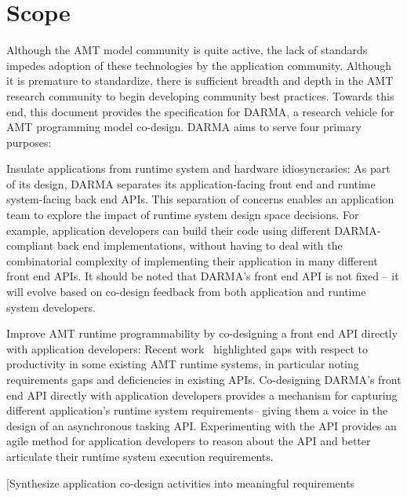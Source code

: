 \section{Scope}\label{sec:scope}
Although the \gls{AMT} model community is quite active, the lack of
standards impedes adoption of these technologies by the application community.
Although it is premature to standardize, there is sufficient  
breadth and depth in the \gls{AMT} research community to begin developing community best
practices.  Towards this end, this document provides the specification for \gls{DARMA},
a research vehicle for \gls{AMT} \gls{programming model} \gls{co-design}.  
\gls{DARMA} aims to serve four primary purposes:
\begin{compactdesc}
\item[Insulate applications from runtime system and hardware idiosyncrasies:]
  As part of its design, \gls{DARMA} separates its application-facing \gls{front end} and
  \gls{runtime system}-facing \gls{back end} \glspl{API}. This separation of concerns 
  enables an application team to explore the impact of \gls{runtime system}
  design space decisions. For example, application developers can build their code using different
  \gls{DARMA}-compliant \gls{back end} implementations, without
  having to deal with the combinatorial complexity of
  implementing their application in many different \gls{front end} \glspl{API}. 
  It should be noted that \gls{DARMA}'s \gls{front end} \gls{API} is not
  fixed -- it will evolve based on \gls{co-design} feedback from both application
  and \gls{runtime system} developers. 
\item[Improve AMT runtime programmability by co-designing a front end  API directly with application developers:]
  Recent work~\cite{L2Sand2015} highlighted gaps with respect to productivity
  in some existing \gls{AMT} \glspl{runtime system}, in particular noting requirements gaps and 
  deficiencies in existing \glspl{API}. Co-designing \gls{DARMA}'s \gls{front end} \gls{API}
  directly with application developers provides a mechanism for capturing
  different application's \gls{runtime system} requirements-- giving them a voice in the design of an
  asynchronous tasking \gls{API}.  Experimenting with the \gls{API} provides an agile method for application
  developers to reason about the \gls{API} 
  and better articulate their \gls{runtime system} execution requirements.
\item[Synthesize application co-design activities into meaningful requirements

\end{compactdesc}
